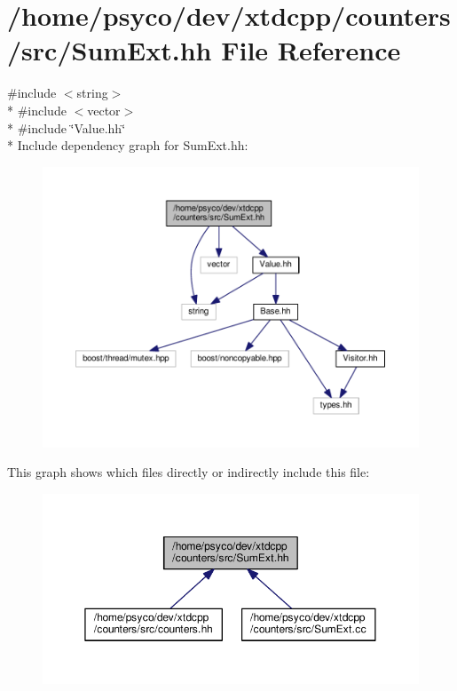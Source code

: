 \hypertarget{SumExt_8hh}{}\section{/home/psyco/dev/xtdcpp/counters/src/\+Sum\+Ext.hh File Reference}
\label{SumExt_8hh}
{\ttfamily \#include $<$string$>$}\\*
{\ttfamily \#include $<$vector$>$}\\*
{\ttfamily \#include \char`\"{}Value.\+hh\char`\"{}}\\*
Include dependency graph for Sum\+Ext.\+hh\+:
\nopagebreak
\begin{figure}[H]
\begin{center}
\leavevmode
\includegraphics[width=350pt]{SumExt_8hh__incl}
\end{center}
\end{figure}
This graph shows which files directly or indirectly include this file\+:
\nopagebreak
\begin{figure}[H]
\begin{center}
\leavevmode
\includegraphics[width=350pt]{SumExt_8hh__dep__incl}
\end{center}
\end{figure}
